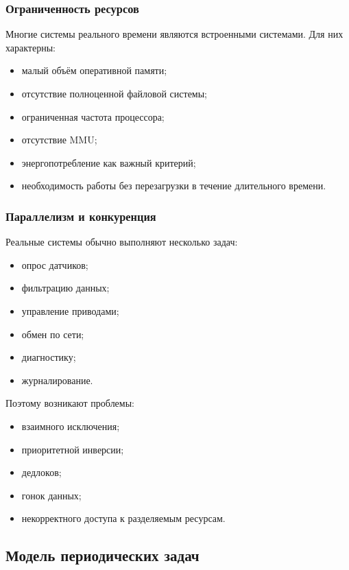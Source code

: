 \documentclass[12pt,a4paper]{article}
\begin{document}
\subsubsection{Ограниченность ресурсов}

Многие системы реального времени являются встроенными системами. Для них характерны:
\begin{itemize}
    \item малый объём оперативной памяти;
    \item отсутствие полноценной файловой системы;
    \item ограниченная частота процессора;
    \item отсутствие MMU;
    \item энергопотребление как важный критерий;
    \item необходимость работы без перезагрузки в течение длительного времени.
\end{itemize}

\subsubsection{Параллелизм и конкуренция}

Реальные системы обычно выполняют несколько задач:
\begin{itemize}
    \item опрос датчиков;
    \item фильтрацию данных;
    \item управление приводами;
    \item обмен по сети;
    \item диагностику;
    \item журналирование.
\end{itemize}

Поэтому возникают проблемы:
\begin{itemize}
    \item взаимного исключения;
    \item приоритетной инверсии;
    \item дедлоков;
    \item гонок данных;
    \item некорректного доступа к разделяемым ресурсам.
\end{itemize}

\subsection{Модель периодических задач}
\end{document}
